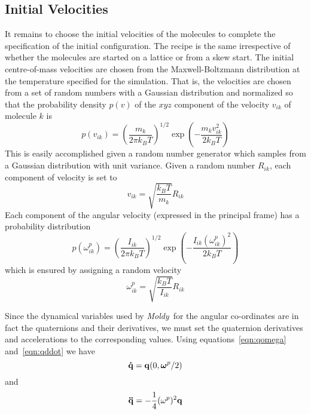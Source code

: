 \documentclass[twoside]{report}
\newcommand{\moldy}{{\em Moldy}}
\newcommand{\bm}[1]{\mbox{\boldmath \protect\(#1\protect\)}}
\begin{document}
\subsection{Initial Velocities}
\label{sec:velinit}
It remains to choose the initial velocities of the molecules to
complete the specification of the initial configuration.  The recipe
is the same irrespective of whether the molecules are started on a
lattice or from a skew start.  The initial centre-of-mass velocities
are chosen from the Maxwell-Boltzmann distribution at the temperature
specified for the simulation\cite[pp 170]{allen:87}.  That is, the
velocities are chosen from a set of random numbers with a Gaussian
distribution and normalized so that the probability density $p(v)$ of
the $xyz$ component of the velocity $v_{ik}$ of molecule $k$ is
\begin{equation}
p(v_{ik}) = \left ( \frac{m_k}{2 \pi k_B T}\right )^{1/2} 
\exp(-\frac{m_k v_{ik}^2}{2 k_B T})
\end{equation}
This is easily accomplished given a random number generator which
samples from a Gaussian distribution with unit variance.  Given a
random number $R_{ik}$, each component of velocity is set to
\begin{equation}
v_{ik} = \sqrt{\frac{k_B T}{m_k}} R_{ik}
\end{equation}
Each component of the angular velocity (expressed in the
principal frame) has a probability distribution
\begin{equation}
p(\omega^p_{ik}) = \left ( \frac{I_{ik}}{2 \pi k_B T}\right )^{1/2}
\exp(-\frac{I_{ik} (\omega^p_{ik})^2}{2 k_B T})
\end{equation}
which is ensured by assigning a random velocity
\begin{equation}
\label{eqn:omega-rand}
\omega^p_{ik} = \sqrt{\frac{k_B T}{I_{ik}}} R_{ik}
\end{equation}

Since the dynamical variables used by \moldy\ for the angular
co-ordinates are in fact the quaternions and their derivatives, we
must set the quaternion derivatives and accelerations to the corresponding
values. Using equations~\ref{eqn:qomega} and~\ref{eqn:qddot} we
have
\begin{equation}
{\bf \dot{q}} = {\bf q}(0,\bm{\omega}^p/2)
\end{equation}
and
\begin{equation}
{\bf \ddot{q}} = -\frac{1}{4}(\omega^p)^2 {\bf q}
\end{equation}
\end{document}

